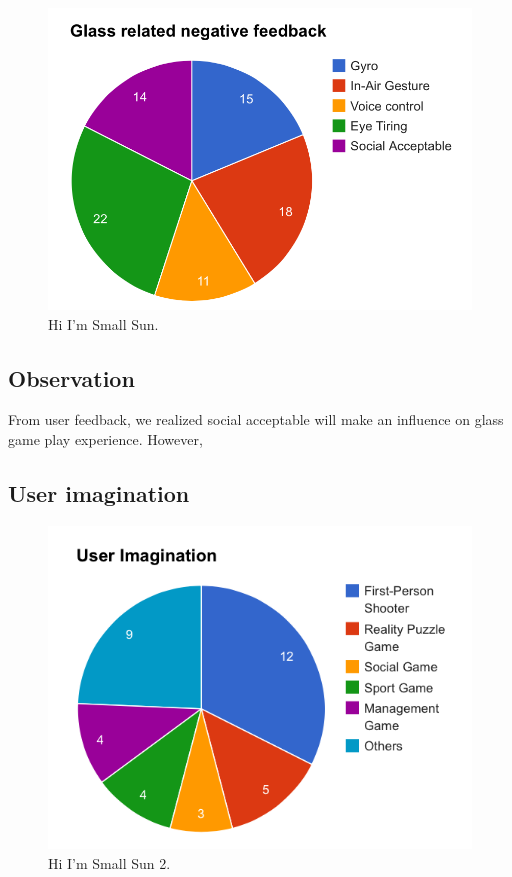 \begin{figure}[!t]
\centering
\includegraphics[width=0.9\columnwidth]{Figures/US1_userfeedbackStatistics.png}
\caption{Hi I'm Small Sun.}
\label{fig:PS_Frus}
\end{figure}


\subsection{Observation}
From user feedback, we realized social acceptable will make an influence on glass game play experience. However, 


\subsection{User imagination}

\begin{figure}[!t]
\centering
\includegraphics[width=0.9\columnwidth]{Figures/US1_userImaginationStatistics.png}
\caption{Hi I'm Small Sun 2.}
\label{fig:PS_Frus}
\end{figure}
